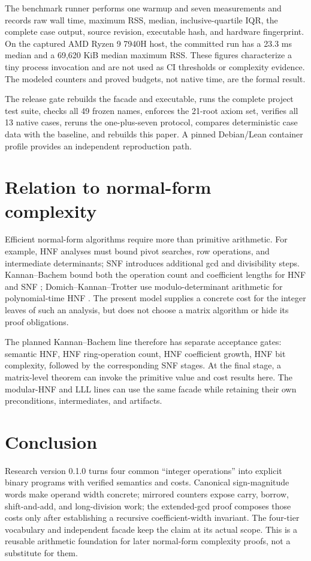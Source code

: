 \documentclass[11pt]{article}
\begin{document}
The benchmark runner performs one warmup and seven measurements and records
raw wall time, maximum RSS, median, inclusive-quartile IQR, the complete case
output, source revision, executable hash, and hardware fingerprint.  On the
captured AMD Ryzen 9 7940H host, the committed run has a 23.3 ms median and a
69,620 KiB median maximum RSS.  These figures characterize a tiny process
invocation and are not used as CI thresholds or complexity evidence.  The
modeled counters and proved budgets, not native time, are the formal result.

The release gate rebuilds the facade and executable, runs the complete
project test suite, checks all 49 frozen names, enforces the 21-root axiom
set, verifies all 13 native cases, reruns the one-plus-seven protocol, compares
deterministic case data with the baseline, and rebuilds this paper.  A pinned
Debian/Lean container profile provides an independent reproduction path.

\section{Relation to normal-form complexity}

Efficient normal-form algorithms require more than primitive arithmetic.
For example, HNF analyses must bound pivot searches, row operations, and
intermediate determinants; SNF introduces additional gcd and divisibility
steps.  Kannan--Bachem bound both the operation count and coefficient lengths
for HNF and SNF \citep{kannanBachem1979}; Domich--Kannan--Trotter use
modulo-determinant arithmetic for polynomial-time HNF
\citep{domichKannanTrotter1987}.  The present model supplies a concrete cost for
the integer leaves of such an analysis, but does not choose a matrix
algorithm or hide its proof obligations.

The planned Kannan--Bachem line therefore has separate acceptance gates:
semantic HNF, HNF ring-operation count, HNF coefficient growth, HNF bit
complexity, followed by the corresponding SNF stages.  At the final stage, a
matrix-level theorem can invoke the primitive value and cost results here.
The modular-HNF and LLL lines can use the same facade while retaining their
own preconditions, intermediates, and artifacts.

\section{Conclusion}

Research version 0.1.0 turns four common ``integer operations'' into explicit
binary programs with verified semantics and costs.  Canonical
sign-magnitude words make operand width concrete; mirrored counters expose
carry, borrow, shift-and-add, and long-division work; the extended-gcd proof
composes those costs only after establishing a recursive coefficient-width
invariant.  The four-tier vocabulary and independent facade keep the claim at
its actual scope.  This is a reusable arithmetic foundation for later
normal-form complexity proofs, not a substitute for them.



\end{document}
